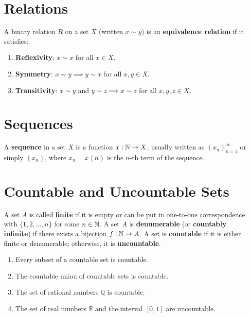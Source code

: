 \section{Relations}
\label{sec:relations}

\begin{definition}
A binary relation $R$ on a set $X$ (written $x \sim y$) is an \textbf{equivalence relation} if it satisfies:
\begin{enumerate}[label=\rm{(\roman*)}]
    \item \textbf{Reflexivity}: $x \sim x$ for all $x \in X$.
    \item \textbf{Symmetry}: $x \sim y \implies y \sim x$ for all $x,y \in X$.
    \item \textbf{Transitivity}: $x \sim y$ and $y \sim z \implies x \sim z$ for all $x,y,z \in X$.
\end{enumerate}
\end{definition}

\section{Sequences}
\label{sec:sequences}

A \textbf{sequence} in a set $X$ is a function $x: \mathbb{N} \to X$, usually written as $(x_n)_{n=1}^\infty$ or simply $(x_n)$, where $x_n = x(n)$ is the $n$-th term of the sequence.

\section{Countable and Uncountable Sets}
\label{sec:countability}

\begin{definition}[Countability]
A set $A$ is called \textbf{finite} if it is empty or can be put in one-to-one correspondence with $\{1, 2, \dots, n\}$ for some $n \in \mathbb{N}$. A set $A$ is \textbf{denumerable} (or \textbf{ countably infinite}) if there exists a bijection $f: \mathbb{N} \to A$. A set is \textbf{countable} if it is either finite or denumerable; otherwise, it is \textbf{uncountable}.
\end{definition}

\begin{theorem}
\begin{enumerate}[label=\rm{(\roman*)}]
    \item Every subset of a countable set is countable.
    \item The countable union of countable sets is countable.
    \item The set of rational numbers $\mathbb{Q}$ is countable.
    \item The set of real numbers $\mathbb{R}$ and the interval $[0,1]$ are uncountable.
\end{enumerate}
\end{theorem}

